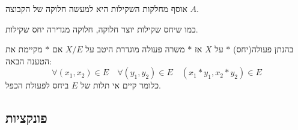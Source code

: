 \documentclass{tstextbook}
\begin{document}
\begin{corollary}
אוסף מחלקות השקילות היא למעשה חלוקה של הקבוצה \(A\).

\end{corollary}
\begin{remark}
כמו שיחס שקילות יוצר חלוקה, חלוקה מגדירה יחס שקילות.

\end{remark}
\begin{definition}
בהנתן פעולה(יחס) \(*\) על \(X\) אז \(*\) משרה פעולה מוגדרת היטב על \(X / E\) אם \(*\) מקיימת את הטענה הבאה:
$$\forall (x_{1},x_{2})\in E\quad \forall(y_{1},y_{2})\in E\quad (x_{1}*y_{1},x_{2}*y_{2})\in E$$
כלומר קיים אי תלות של \(E\) ביחס לפעולת הכפל.

\end{definition}
\subsection{פונקציות}
\end{document}
